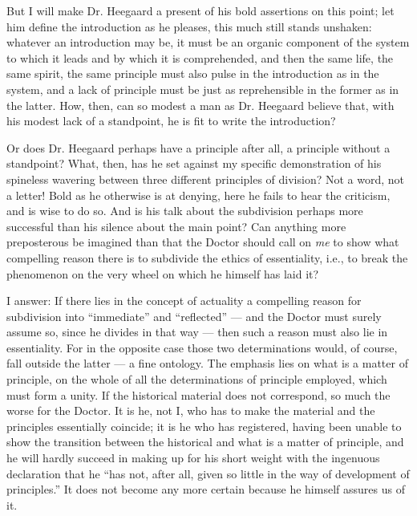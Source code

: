 \documentclass[12pt,a4paper,openany]{book}
\newcommand{\opage}[1]{\marginnote{\footnotesize\textit{[#1]}}}
\begin{document}
But I will make Dr. Heegaard a present of his bold assertions on
this point; let him define the introduction as he pleases, this much
still stands unshaken: whatever an introduction may be, it must be an
organic component of the system to which it leads and by which it is
comprehended, and then the same life, the same spirit, the same
principle must also pulse in the introduction as in the system, and a
lack of principle must be just as reprehensible in the former as in
the latter. How, then, can so modest a man as Dr. Heegaard believe
that, with his modest lack of a standpoint, he is fit to write the
introduction?

Or does Dr. Heegaard perhaps have a principle after all, a
\opage{38}principle without a standpoint? What, then, has he set against
my specific demonstration of his spineless wavering between three
different principles of division? Not a word, not a letter!
Bold as he otherwise is at denying, here he fails to hear the criticism, and
is wise to do so. And is his talk about the subdivision perhaps more
successful than his silence about the main point? Can anything more
preposterous be imagined than that the Doctor should call on \emph{me}
to show what compelling reason there is to subdivide the ethics of
essentiality, i.e., to break the phenomenon on the very wheel on
which he himself has laid it?

I answer: If there lies in the concept of actuality a compelling
reason for subdivision into ``immediate'' and ``reflected'' --- and
the Doctor must surely assume so, since he divides in that way ---
then such a reason must also lie in essentiality. For in the opposite
case those two determinations would, of course, fall outside the
latter --- a fine ontology. The emphasis lies on what is a matter of
principle, on the whole of all the determinations of principle
employed, which must form a unity. If the historical material does
not correspond, so much the worse for the Doctor. It is he, not I,
who has to make the material and the principles essentially coincide;
it is he who has registered, having been unable to show the
transition between the historical and what is a matter of principle,
and he will hardly succeed in making up for his short weight with the
ingenuous declaration that he ``has not, after all, given so little
in the way of development of principles.'' It does not become any
more certain because he himself assures us of it.
\end{document}

